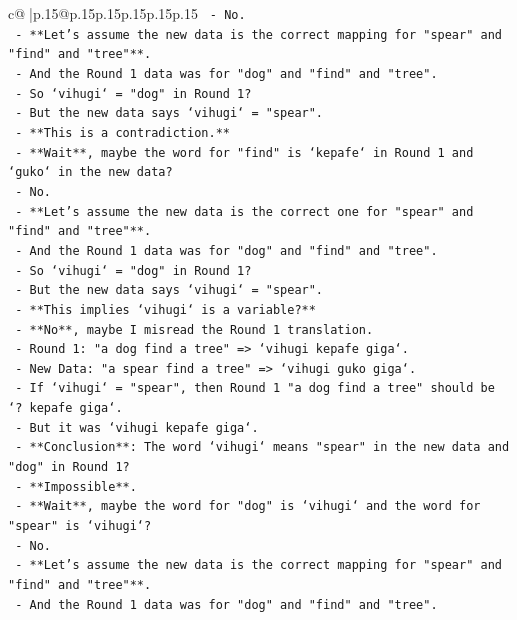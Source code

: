\documentclass{article}
\begin{document}
{\begin{supertabular}{c@{$\;$}|p{.15\linewidth}@{}p{.15\linewidth}p{.15\linewidth}p{.15\linewidth}p{.15\linewidth}p{.15\linewidth}}
{{{\texttt{    {-} No.} \\
\texttt{    {-} **Let's assume the new data is the correct mapping for "spear" and "find" and "tree"**.} \\
\texttt{    {-} And the Round 1 data was for "dog" and "find" and "tree".} \\
\texttt{    {-} So `vihugi` = "dog" in Round 1?} \\
\texttt{    {-} But the new data says `vihugi` = "spear".} \\
\texttt{    {-} **This is a contradiction.**} \\
\texttt{    {-} **Wait**, maybe the word for "find" is `kepafe` in Round 1 and `guko` in the new data?} \\
\texttt{    {-} No.} \\
\texttt{    {-} **Let's assume the new data is the correct one for "spear" and "find" and "tree"**.} \\
\texttt{    {-} And the Round 1 data was for "dog" and "find" and "tree".} \\
\texttt{    {-} So `vihugi` = "dog" in Round 1?} \\
\texttt{    {-} But the new data says `vihugi` = "spear".} \\
\texttt{    {-} **This implies `vihugi` is a variable?**} \\
\texttt{    {-} **No**, maybe I misread the Round 1 translation.} \\
\texttt{    {-} Round 1: "a dog find a tree" => `vihugi kepafe giga`.} \\
\texttt{    {-} New Data: "a spear find a tree" => `vihugi guko giga`.} \\
\texttt{    {-} If `vihugi` = "spear", then Round 1 "a dog find a tree" should be `? kepafe giga`.} \\
\texttt{    {-} But it was `vihugi kepafe giga`.} \\
\texttt{    {-} **Conclusion**: The word `vihugi` means "spear" in the new data and "dog" in Round 1?} \\
\texttt{    {-} **Impossible**.} \\
\texttt{    {-} **Wait**, maybe the word for "dog" is `vihugi` and the word for "spear" is `vihugi`?} \\
\texttt{    {-} No.} \\
\texttt{    {-} **Let's assume the new data is the correct mapping for "spear" and "find" and "tree"**.} \\
\texttt{    {-} And the Round 1 data was for "dog" and "find" and "tree".} \\
}}}
\end{supertabular}}
\end{document}
